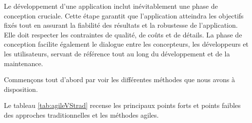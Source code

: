 \documentclass[12pt]{report}
\begin{document}
				\hspace{15pt} Le développement d'une application inclut inévitablement une phase de conception cruciale. Cette étape garantit que l'application atteindra les objectifs fixés tout en assurant la fiabilité des résultats et la robustesse de l'application. Elle doit respecter les contraintes de qualité, de coûts et de détails. La phase de conception facilite également le dialogue entre les concepteurs, les développeurs et les utilisateurs, servant de référence tout au long du développement et de la maintenance.
	
				Commençons tout d'abord par voir les différentes méthodes que nous avons à disposition.

				Le tableau \ref{tab:agileVStrad} recense les principaux points forts et points faibles des approches traditionnelles et les méthodes agiles.
\end{document}
